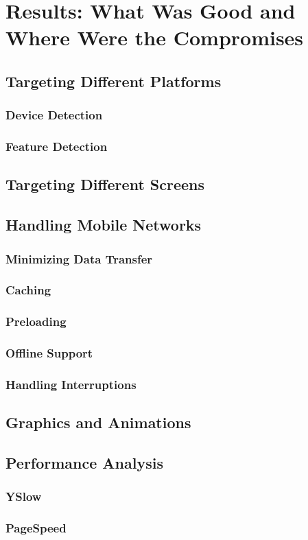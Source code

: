 \chapter{Results: What Was Good and Where Were the Compromises}
\label{chapter:results}

\section{Targeting Different Platforms}
\label{section:targeting-platforms}

\subsection{Device Detection}
\subsection{Feature Detection}

\section{Targeting Different Screens}
\label{section:targeting-screens}

\section{Handling Mobile Networks}
\label{section:handling-networks}

\subsection{Minimizing Data Transfer}
\subsection{Caching}
\subsection{Preloading}
\subsection{Offline Support}
\subsection{Handling Interruptions}

\section{Graphics and Animations}
\label{section:graphics}

\section{Performance Analysis}
\label{section:performance-analysis}

\subsection{YSlow}
\subsection{PageSpeed}
